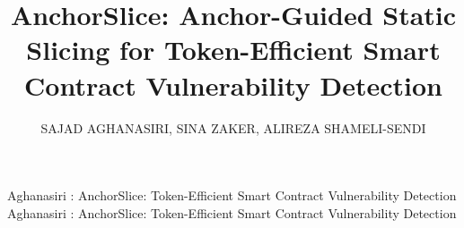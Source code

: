 \documentclass{ieeeaccess}
\begin{document}

\title{AnchorSlice: Anchor-Guided Static Slicing for Token-Efficient Smart Contract Vulnerability Detection}

\author{\uppercase{Sajad Aghanasiri},
\uppercase{Sina Zaker},
\uppercase{Alireza Shameli-Sendi}}

\address[1]{Faculty of Computer Science and Engineering, Shahid Beheshti University (SBU), Tehran, Iran
(e-mail: \{s.aghanasiri, a\_shameli\}@sbu.ac.ir)}


\markboth
{Aghanasiri \headeretal: AnchorSlice: Token-Efficient Smart Contract Vulnerability Detection}
{Aghanasiri \headeretal: AnchorSlice: Token-Efficient Smart Contract Vulnerability Detection}

\end{document}

